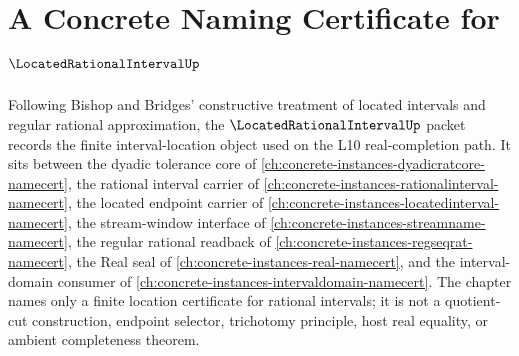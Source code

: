 \chapter{A Concrete Naming Certificate for $\LocatedRationalIntervalUp$}
\label{ch:concrete-instances-located-rational-interval-namecert}

Following Bishop and Bridges' constructive treatment of located intervals and regular rational approximation, the $\LocatedRationalIntervalUp$ packet records the finite interval-location object used on the L10 real-completion path. It sits between the dyadic tolerance core of \autoref{ch:concrete-instances-dyadicratcore-namecert}, the rational interval carrier of \autoref{ch:concrete-instances-rationalinterval-namecert}, the located endpoint carrier of \autoref{ch:concrete-instances-locatedinterval-namecert}, the stream-window interface of \autoref{ch:concrete-instances-streamname-namecert}, the regular rational readback of \autoref{ch:concrete-instances-regseqrat-namecert}, the Real seal of \autoref{ch:concrete-instances-real-namecert}, and the interval-domain consumer of \autoref{ch:concrete-instances-intervaldomain-namecert}. The chapter names only a finite location certificate for rational intervals; it is not a quotient-cut construction, endpoint selector, trichotomy principle, host real equality, or ambient completeness theorem.

